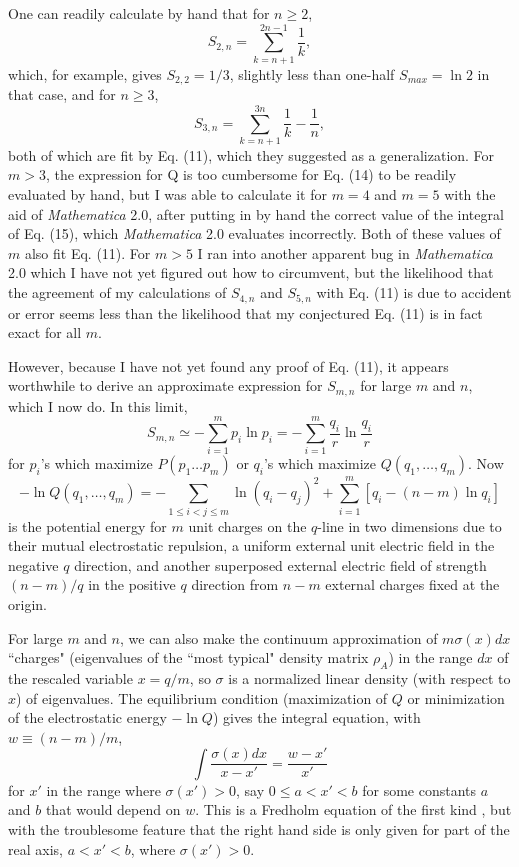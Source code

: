 \documentclass[12pt]{article}
\begin{document}
One can readily calculate by hand that for $n\geq 2$,
	\begin{equation}
	S_{2,n}=\sum_{k=n+1}^{2n-1}\frac{1}{k},
	\end{equation}
which, for example, gives $S_{2,2}=1/3$, slightly less than one-half
$S_{max}=\ln 2$ in that case, and for $n\geq 3$,
	\begin{equation}
	S_{3,n}=\sum_{k=n+1}^{3n}\frac{1}{k} - \frac{1}{n},
	\end{equation}
both of which are fit by Eq. (11), which they suggested as a
generalization.
For $m>3$, the expression for Q is too cumbersome for Eq. (14) to be
readily
evaluated by hand, but I was able to calculate it for $m=4$ and $m=5$
with the
aid of {\it Mathematica} 2.0, after putting in by hand the correct
value of the
integral of Eq. (15), which {\it Mathematica} 2.0 evaluates
incorrectly.  Both
of these values of $m$ also fit Eq. (11).  For $m>5$ I ran into
another
apparent bug in {\it Mathematica} 2.0 which I have not yet figured
out how to
circumvent, but the likelihood that the agreement of my calculations
of
$S_{4,n}$ and $S_{5,n}$ with Eq. (11) is due to accident or error
seems less
than the likelihood that my conjectured Eq. (11) is in fact exact for
all $m$.

However, because I have not yet found any proof of Eq. (11), it
appears
worthwhile to derive an approximate expression for $S_{m,n}$ for
large $m$ and
$n$, which I now do.  In this limit,
	\begin{equation}
	S_{m,n}\simeq -\sum_{i=1}^{m}p_i \ln p_i =
	-\sum_{i=1}^{m}\frac{q_i}{r}\ln \frac{q_i}{r}
	\end{equation}
for $p_i$'s which maximize $P(p_1\ldots p_m)$ or $q_i$'s which
maximize
$Q(q_1,\ldots,q_m)$.  Now
	\begin{equation}
	-\ln Q(q_1,\ldots,q_m)=-\sum_{1\leq i<j\leq m} \ln
(q_i-q_j)^2+
	\sum_{i=1}^{m}[ q_i -(n-m)\ln q_i]
	\end{equation}
is the potential energy for $m$ unit charges on the $q$-line in two
dimensions
due to their mutual electrostatic repulsion, a uniform external unit
electric
field in the negative $q$ direction, and another superposed external
electric
field of strength $(n-m)/q$ in the positive $q$ direction from $n-m$
external
charges fixed at the origin.

For large $m$ and $n$, we can also make the continuum approximation
of
$m\sigma(x)dx$ ``charges" (eigenvalues of the ``most typical" density
matrix
$\rho_A$) in the range $dx$ of the rescaled variable $x=q/m$, so
$\sigma$ is a
normalized linear density (with respect to $x$) of eigenvalues.  The
equilibrium condition (maximization of $Q$ or minimization of the
electrostatic
energy $-\ln Q$) gives the integral equation, with $w\equiv (n-m)/m$,
	\begin{equation}
        \int \frac{\sigma(x)dx}{x-x'} = \frac{w-x'}{x'}
	\end{equation}
for $x'$ in the range where $\sigma(x')>0$, say $0\leq a<x'<b$ for
some
constants $a$ and $b$ that would depend on $w$.  This is a Fredholm
equation of
the first kind \cite{MW}, but with the troublesome feature that the
right hand
side is only given for part of the real axis, $a<x'<b$, where
$\sigma(x')>0$.
\end{document}
